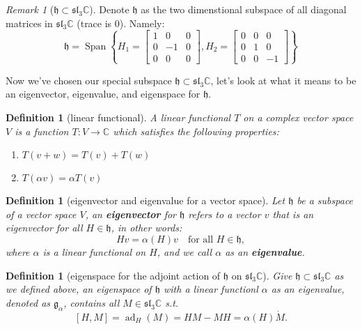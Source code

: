\documentclass[a4paper]{article}
\newcommand{\C}{\mathbb{C}}
\theoremstyle{bfnote} %
\theoremstyle{bfnote}                  %
\newtheorem{defn}[thm]{Definition}
\theoremstyle{example}                       %
\theoremstyle{remark}                       %
\newtheorem{rem}[thm]{Remark}
\numberwithin{equation}{section}
\begin{document}
\begin{rem}[$\mathfrak{h} \subset \mathfrak{sl}_{3}\C$]
	Denote $\mathfrak{h}$ as the two dimenstional subspace of all diagonal matrices in  $\mathfrak{sl}_3\C$ (trace is $0$). Namely:  \[
		\mathfrak{h} = \operatorname{Span}\left\{ H_1=\begin{bmatrix} 1 & 0 &0 \\ 0 & -1 & 0 \\ 0 &0 &0 \end{bmatrix}, H_2 = \begin{bmatrix} 0 &0 &0 \\ 0 &1&0\\0&0&-1 \end{bmatrix}   \right\} 
	\] 
\end{rem}

\bigskip

Now we've chosen our special subspace $\mathfrak{h} \subset \mathfrak{sl}_3\C$, let's look at what it means to be an eigenvector, eigenvalue, and eigenspace for $\mathfrak{h}$.

\begin{defn}[linear functional]
	A linear functional $T$ on a complex vector space  $V$ is a function  $T: V \to \C$ which satisfies the following properties:
	\begin{enumerate}
		\item $T(v+w) = T(v) + T(w)$ 
		\item $T(\alpha v) = \alpha T(v)$
	\end{enumerate}
\end{defn}


\begin{defn}[eigenvector and eigenvalue for a vector space]
	Let $\mathfrak{h}$ be a subspace of a vector space $V$, an  \textbf{eigenvector} for $\mathfrak{h}$ refers to a vector  $v$ that is an eigenvector for all  $H \in \mathfrak{h}$, in other words: \[
		H v = \alpha(H) v \quad \text{for all $H \in \mathfrak{h}$},
	\]  where $\alpha$ is a linear functional on  $H$, and we call $\alpha$ as an \textbf{eigenvalue}. 
\end{defn}

 \begin{defn}[eigenspace for the adjoint action of $\mathfrak{h}$ on  $\mathfrak{sl}_3\C$]
	 Give $\mathfrak{h} \subset \mathfrak{sl}_3\C$ as we defined above, an eigenspace of $\mathfrak{h}$ with a linear functionl  $\alpha$ as an eigenvalue, denoted as  $\mathfrak{g}_{\alpha}$, contains all $M \in \mathfrak{sl}_3\C$ s.t. \[
		 \left[ H,M \right] = \operatorname{ad}_{H}(M) = HM - MH = \alpha(H) \dot M. 
	 \] 
\end{defn}
\end{document}
